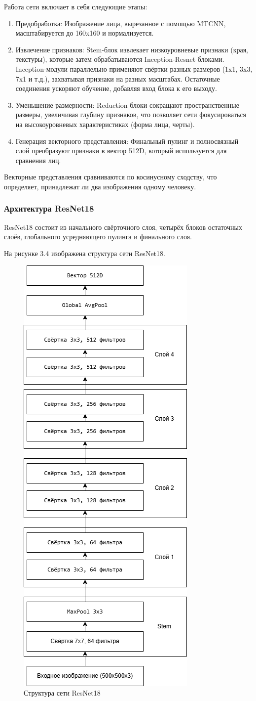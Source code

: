  Работа сети включает в себя следующие этапы:
 
\begin{enumerate}
	\item Предобработка: Изображение лица, вырезанное с помощью MTCNN, масштабируется до 160x160 и нормализуется.
	\item Извлечение признаков: Stem-блок извлекает низкоуровневые признаки (края, текстуры), которые затем обрабатываются Inception-Resnet блоками. Inception-модули параллельно применяют свёртки разных размеров (1x1, 3x3, 7x1 и т.д.), захватывая признаки на разных масштабах. Остаточные соединения ускоряют обучение, добавляя вход блока к его выходу.
	\item Уменьшение размерности: Reduction блоки сокращают пространственные размеры, увеличивая глубину признаков, что позволяет сети фокусироваться на высокоуровневых характеристиках (форма лица, черты).
	\item Генерация векторного представления: Финальный пулинг и полносвязный слой преобразуют признаки в вектор 512D, который используется для сравнения лиц.
\end{enumerate}

Векторные представления сравниваются по косинусному сходству, что определяет, принадлежат ли два изображения одному человеку.

\subsubsection{Архитектура ResNet18}

ResNet18 состоит из начального свёрточного слоя, четырёх блоков остаточных слоёв, глобального усредняющего пулинга и финального слоя. 

На рисунке 3.4 изображена структура сети ResNet18.

\begin{figure}[H]
	\centering
	\includegraphics[width=0.3\linewidth]{images/resnet18}
	\caption{Структура сети ResNet18}
	\label{fig:resnet18}
\end{figure}

